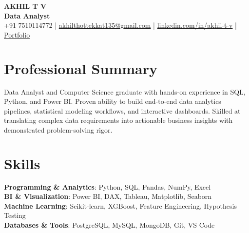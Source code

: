 \documentclass[a4paper,11pt]{article}
\begin{document}

\begin{center}

    {\LARGE \textbf{AKHIL T V}} \\[4pt]

    \textbf{Data Analyst} \\[4pt]

    \small
    +91 7510114772
    \hspace{0.3cm} | \hspace{0.3cm}
    \href{mailto:akhilthottekkat135@gmail.com}
    {akhilthottekkat135@gmail.com}
    \hspace{0.3cm} | \hspace{0.3cm}
    \href{https://www.linkedin.com/in/akhil-t-v}
    {linkedin.com/in/akhil-t-v}
    \hspace{0.3cm} | \hspace{0.3cm}
    \href{https://akhil-tv-portfolio.vercel.app/}
    {Portfolio}

\end{center}

\vspace{-0.25cm}


\section*{Professional Summary}

Data Analyst and Computer Science graduate with hands-on experience in SQL, Python, and Power BI. Proven ability to build end-to-end data analytics pipelines, statistical modeling workflows, and interactive dashboards. Skilled at translating complex data requirements into actionable business insights with demonstrated problem-solving rigor.


\section*{Skills}

\textbf{Programming \& Analytics}: Python, SQL, Pandas, NumPy, Excel \\[2pt]
\textbf{BI \& Visualization}: Power BI, DAX, Tableau, Matplotlib, Seaborn \\[2pt]
\textbf{Machine Learning}: Scikit-learn, XGBoost, Feature Engineering, Hypothesis Testing \\[2pt]
\textbf{Databases \& Tools}: PostgreSQL, MySQL, MongoDB, Git, VS Code
\end{document}
